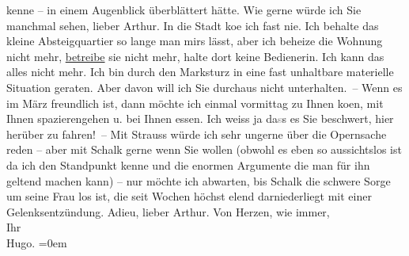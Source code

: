 \begin{ledgroupsized}[t]{13cm}
                    kenne – in einem Augenblick überblättert hätte.\pend
           \pstart
           Wie gerne würde ich Sie manchmal sehen, lieber Arthur. In die Stadt ko{\geminationm}e ich fast nie. Ich behalte das kleine
                    Absteigquartier so lange man mirs lässt, aber ich beheize die Wohnung nicht
                    mehr, \uline{betreibe} sie nicht mehr, halte dort keine
                    Bedienerin. Ich kann das alles nicht mehr. Ich bin durch den Marksturz in eine
                    fast unhaltbare materielle Situation geraten. Aber davon will {\pb}ich Sie durchaus nicht
                    unterhalten. – Wenn es im März freundlich ist, dann möchte ich
                    einmal vormittag zu Ihnen ko{\geminationm}en, mit Ihnen
                    spazierengehen u. bei Ihnen essen. Ich weiss ja da\textcolor{gray}{s}s es Sie beschwert, hier
                    herüber zu fahren! –\pend
           \pstart
           Mit Strauss würde ich sehr ungerne über die
                        Opernsache reden – aber
                    mit Schalk gerne wenn Sie wollen (obwohl es
                    eben so aussichtslos ist da ich den Standpunkt kenne und die enormen Argumente
                    die man für ihn geltend machen kann) – nur möchte ich abwarten, bis Schalk die schwere Sorge um seine Frau los ist, die seit
                    Wochen höchst elend darniederliegt mit einer Gelenksentzündung.\pend
           \pstart
           Adieu, lieber Arthur.\pend
           \pstart
           Von Herzen, wie immer,{\\[\baselineskip]}Ihr{\\[\baselineskip]}\spacefill\mbox{Hugo.}\pend
           \leftskip=0em{}\endnumbering{}\end{ledgroupsized}  \newcommand{\dateiname}{L02396}\newcommand{\titel}{Hugo Hofmannsthal an Arthur Schnitzler, 16. 1. 1923}\newcommand{\editorInnen}{Martin Anton Müller und Gerd-Hermann Susen}
      